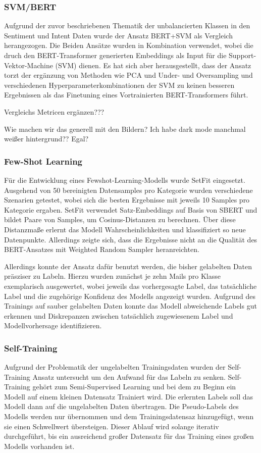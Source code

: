 \subsubsection{SVM/BERT}

Aufgrund der zuvor beschriebenen Thematik der unbalancierten Klassen in den Sentiment und
Intent Daten wurde der Ansatz BERT+SVM als Vergleich herangezogen. Die Beiden Ansätze wurden
in Kombination verwendet, wobei die druch den BERT-Transformer generierten Embeddings als Input
für die Support-Vektor-Machine (SVM) dienen. Es hat sich aber herausgestellt, dass der Ansatz
torzt der ergänzung von Methoden wie PCA und Under- und Oversampling und verschiedenen
Hyperparameterkombinationen der SVM zu keinen besseren Ergebnissen als das Finetuning eines
Vortrainierten BERT-Transformers führt.  

Vergleichs Metricen ergänzen??? 

Wie machen wir das generell mit den Bildern? Ich habe dark mode manchmal weißer hintergrund??
Egal? 


\subsubsection{Few-Shot Learning}

Für die Entwicklung eines Fewshot-Learning-Modells wurde SetFit eingesetzt. Ausgehend von
50 bereinigten Datensamples pro Kategorie wurden verschiedene Szenarien getestet, wobei sich
die besten Ergebnisse mit jeweils 10 Samples pro Kategorie ergaben. SetFit verwendet
Satz-Embeddings auf Basis von SBERT und bildet Paare von Samples, um Cosinus-Distanzen zu
berechnen. Über diese Distanzmaße erlernt das Modell Wahrscheinlichkeiten und klassifiziert so
neue Datenpunkte. Allerdings zeigte sich, dass die Ergebnisse nicht an die Qualität des
BERT-Ansatzes mit Weighted Random Sampler heranreichten.

Allerdings konnte der Ansatz dafür benutzt werden, die bisher gelabelten Daten präsziser zu
Labeln. Hierzu wurden zunächst je zehn Mails pro Klasse exemplarisch ausgewertet, wobei jeweils
das vorhergesagte Label, das tatsächliche Label und die zugehörige Konfidenz des Modells
angezeigt wurden. Aufgrund des Trainings auf sauber gelabelten Daten konnte das Modell
abweichende Labels gut erkennen und Diskrepanzen zwischen tatsächlich zugewiesenem Label und
Modellvorhersage identifizieren. 


\subsubsection{Self-Training}
Aufgrund der Problematik der ungelabelten Trainingsdaten wurden der Self-Training Ansatz
untersucht um den Aufwand für das Labeln zu senken. Self-Training gehört zum Semi-Supervised
Learning und bei dem zu Beginn ein Modell auf einem kleinen Datensatz Trainiert wird. Die
erlernten Labels soll das Modell dann auf die ungelabelten Daten übertragen. Die Pseudo-Labels
des Modells werden nur übernommen und dem Trainingsdatensaz hinzugefügt, wenn sie einen
Schwellwert übersteigen. Dieser Ablauf wird solange iterativ durchgeführt, bis ein ausreichend
großer Datensatz für das Training eines großen Modells vorhanden ist.  

